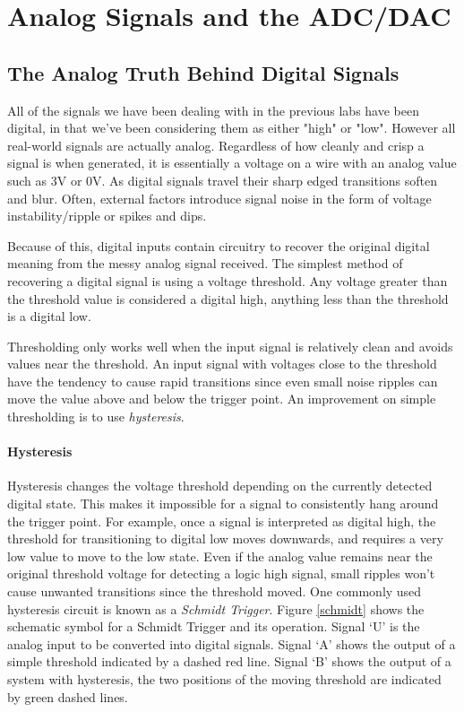 \documentclass[11pt,fleqn]{book} %
\begin{document}
	
\chapter{Analog Signals and the ADC/DAC}


\section{The Analog Truth Behind Digital Signals}
All of the signals we have been dealing with in the previous labs have been digital, in that we've been considering them as either "high" or "low". However all real-world signals are actually analog. Regardless of how cleanly and crisp a signal is when generated, it is essentially a voltage on a wire with an analog value such as 3V or 0V. As digital signals travel their sharp edged transitions soften and blur. Often, external factors introduce signal noise in the form of voltage instability/ripple or spikes and dips.

Because of this, digital inputs contain circuitry to recover the original digital meaning from the messy analog signal received. The simplest method of recovering a digital signal is using a voltage threshold. Any voltage greater than the threshold value is considered a digital high, anything less than the threshold is a digital low. 

Thresholding only works well when the input signal is relatively clean and avoids values near the threshold. An input signal with voltages close to the threshold have the tendency to cause rapid transitions since even small noise ripples can move the value above and below the trigger point. An improvement on simple thresholding is to use \textit{hysteresis}. 

\subsubsection{Hysteresis}

Hysteresis changes the voltage threshold depending on the currently detected digital state. This makes it impossible for a signal to consistently hang around the trigger point. For example, once a signal is interpreted as digital high, the threshold for transitioning to digital low moves downwards, and requires a very low value to move to the low state. Even if the analog value remains near the original threshold voltage for detecting a logic high signal, small ripples won't cause unwanted transitions since the threshold moved. One commonly used hysteresis circuit is known as a \textit{Schmidt Trigger}. Figure \ref{schmidt} shows the schematic symbol for a Schmidt Trigger and its operation. Signal `U' is the analog input to be converted into digital signals. Signal `A' shows the output of a simple threshold indicated by a dashed red line. Signal `B' shows the output of a system with hysteresis, the two positions of the moving threshold are indicated by green dashed lines. 
\end{document}
